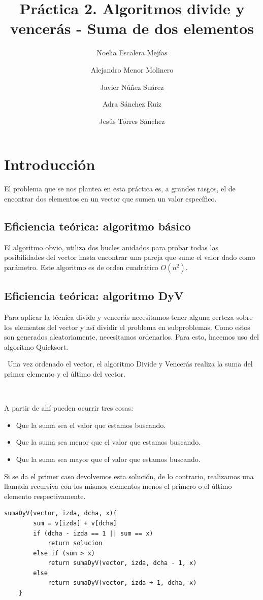 \documentclass{article}
\title{Práctica 2. Algoritmos divide y vencerás - Suma de dos elementos}
\author{Noelia Escalera Mejías \\
		\and Alejandro Menor Molinero \\
		\and Javier Núñez Suárez \\
		\and Adra Sánchez Ruiz \\
		\and Jesús Torres Sánchez}
\begin{document}
	\maketitle
	\section{Introducción}
	El problema que se nos plantea en esta práctica es, a grandes rasgos, el de encontrar dos elementos en un vector que sumen un valor específico. 
	
	
	\subsection{Eficiencia teórica: algoritmo básico}
	
	El algoritmo obvio, utiliza dos bucles anidados para probar todas las posibilidades del vector hasta encontrar una pareja que sume el valor dado como parámetro.
	Este algoritmo es de orden cuadrático $O(n^2)$.
	
	
	\subsection{Eficiencia teórica: algoritmo DyV}
	Para aplicar la técnica divide y vencerás necesitamos tener alguna certeza sobre los elementos del vector y así dividir el problema en subproblemas. Como estos son generados aleatoriamente, necesitamos ordenarlos.
	Para esto, hacemos uso del algoritmo Quicksort.
	
	\
	Una vez ordenado el vector, el algoritmo Divide y Vencerás realiza la suma del primer elemento y el último del vector.
	
	\
	
	A partir de ahí pueden ocurrir tres cosas:
	\begin{itemize}
		\item Que la suma sea el valor que estamos buscando.
		\item Que la suma sea menor que el valor que estamos buscando.
		\item Que la suma sea mayor que el valor que estamos buscando.
	\end{itemize}

	Si se da el primer caso devolvemos esta solución, de lo contrario, realizamos una llamada recursiva con los mismos elementos menos el primero o el último elemento respectivamente.
	
	\begin{lstlisting}[caption=Pseudocódigo del algoritmo DyV]
	sumaDyV(vector, izda, dcha, x){
		sum = v[izda] + v[dcha]
		if (dcha - izda == 1 || sum == x)
			return solucion
		else if (sum > x)
			return sumaDyV(vector, izda, dcha - 1, x)
		else
			return sumaDyV(vector, izda + 1, dcha, x)
	}
	\end{lstlisting}
\end{document}
